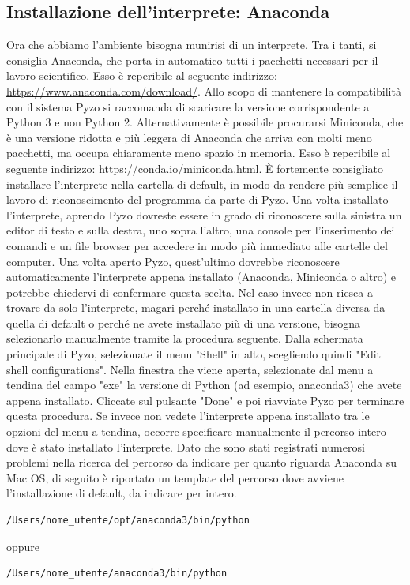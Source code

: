 \documentclass[10pt,a4paper]{article}
\begin{document}
\subsection{Installazione dell'interprete: Anaconda}
Ora che abbiamo l'ambiente bisogna munirisi di un interprete. Tra i tanti, si consiglia Anaconda, che porta in automatico tutti i pacchetti necessari per il lavoro scientifico. Esso è reperibile al seguente indirizzo: \url{https://www.anaconda.com/download/}. Allo scopo di mantenere la compatibilità con il sistema Pyzo si raccomanda di scaricare la versione corrispondente a Python 3 e non Python 2. Alternativamente è possibile procurarsi Miniconda, che è una versione ridotta e più leggera di Anaconda che arriva con molti meno pacchetti, ma occupa chiaramente meno spazio in memoria. Esso è reperibile al seguente indirizzo: \url{https://conda.io/miniconda.html}. È fortemente consigliato installare l'interprete nella cartella di default, in modo da rendere più semplice il lavoro di riconoscimento del programma da parte di Pyzo. Una volta installato l'interprete, aprendo Pyzo dovreste essere in grado di riconoscere sulla sinistra un editor di testo e sulla destra, uno sopra l'altro, una console per l'inserimento dei comandi e un file browser
per accedere in modo più immediato alle cartelle del computer.
Una volta aperto Pyzo, quest'ultimo dovrebbe riconoscere automaticamente l'interprete appena installato (Anaconda, Miniconda o altro) e potrebbe chiedervi di confermare questa scelta. Nel caso invece non riesca a trovare da solo l'interprete, magari perché installato in una cartella diversa da quella di default o perché ne avete installato più di una versione, bisogna selezionarlo manualmente tramite la procedura seguente.
Dalla schermata principale di Pyzo, selezionate il menu "Shell" in alto, scegliendo quindi "Edit shell configurations". Nella finestra che viene aperta, selezionate dal menu a tendina del campo "exe" la versione di Python (ad esempio, anaconda3) che avete appena installato. Cliccate sul pulsante "Done" e poi riavviate Pyzo per terminare questa procedura.
Se invece non vedete l'interprete appena installato tra le opzioni del menu a tendina, occorre specificare manualmente il percorso intero dove è stato installato l'interprete. Dato che sono stati registrati numerosi problemi nella ricerca del percorso da indicare per quanto riguarda Anaconda su Mac OS, di seguito è riportato un template del percorso dove avviene l'installazione di default, da indicare per intero.
\begin{lstlisting}
/Users/nome_utente/opt/anaconda3/bin/python
\end{lstlisting}
oppure
\begin{lstlisting}
/Users/nome_utente/anaconda3/bin/python
\end{lstlisting}
\end{document}
